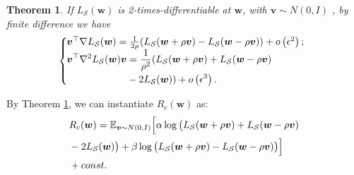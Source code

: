 \documentclass[letterpaper]{article} %
\theoremstyle{plain}
\newtheorem{theorem}{Theorem}
\theoremstyle{definition}
\begin{document}
\begin{theorem} \label{theorem:fd}
If $L_{\mathcal{S}}(\boldsymbol{w})$ is 2-times-differentiable at $\boldsymbol{w}$, with $\boldsymbol{v} \sim N(0, I)$ , by finite difference we have
\begin{equation*}
\left\{\begin{array}{l}
\hspace{-0.2cm}\boldsymbol{v}^{\top} \nabla L_{\mathcal{S}}(\boldsymbol{w}) =\frac{1}{2\rho} (L_{\mathcal{S}}(\boldsymbol{w} + \rho\boldsymbol{v})- L_{\mathcal{S}}(\boldsymbol{w} - \rho\boldsymbol{v}))+o\left(\epsilon^2\right) ; \\

\begin{aligned}
\hspace{-0.2cm}\boldsymbol{v}^{\top} \nabla^2 L_{\mathcal{S}}(\boldsymbol{w}) \boldsymbol{v} &= \frac{1}{\rho^2} (L_{\mathcal{S}}(\boldsymbol{w}+\rho\boldsymbol{v})+L_{\mathcal{S}}(\boldsymbol{w}-\rho\boldsymbol{v}) \\
&-2 L_{\mathcal{S}}(\boldsymbol{w}))+o\left(\epsilon^3\right).
\end{aligned}
\end{array}\right.
\end{equation*}
\end{theorem}

By Theorem \ref{theorem:fd}, we can instantiate $R_c(\boldsymbol{w})$ as:
\begin{align}\label{eq:R_c_fd}
&R_c(\boldsymbol{w}) =\mathbb{E}_{\boldsymbol{v} \sim N(0, I)} \Big[\alpha \log\big(L_{\mathcal{S}}(\boldsymbol{w}+\rho\boldsymbol{v})+L_{\mathcal{S}}(\boldsymbol{w}-\rho\boldsymbol{v}) \notag\\ 
&-2 L_{\mathcal{S}}(\boldsymbol{w})\big) 
+ \beta \log\big( L_{\mathcal{S}}(\boldsymbol{w} + \rho\boldsymbol{v})-L_{\mathcal{S}}(\boldsymbol{w} - \rho\boldsymbol{v})\big)\Big] \notag\\
&+ const.
\end{align}
\end{document}
